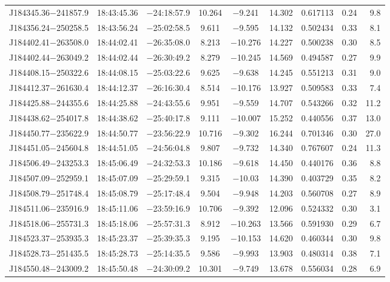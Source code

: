 \begin{table*}
\begin{tabular}{lcccccccr}
J184345.36$-$241857.9 & 18:43:45.36 & $-$24:18:57.9 & 10.264 & $-$9.241 & 14.302 & 0.617113 & 0.24 & 9.8 \\
J184356.24$-$250258.5 & 18:43:56.24 & $-$25:02:58.5 &  9.611 & $-$9.595 & 14.132 & 0.502434 & 0.33 & 8.1 \\
J184402.41$-$263508.0 & 18:44:02.41 & $-$26:35:08.0 &  8.213 & $-$10.276 & 14.227 & 0.500238 & 0.30 & 8.5 \\
J184402.44$-$263049.2 & 18:44:02.44 & $-$26:30:49.2 &  8.279 & $-$10.245 & 14.569 & 0.494587 & 0.27 & 9.9 \\
J184408.15$-$250322.6 & 18:44:08.15 & $-$25:03:22.6 &  9.625 & $-$9.638 & 14.245 & 0.551213 & 0.31 & 9.0 \\
J184412.37$-$261630.4 & 18:44:12.37 & $-$26:16:30.4 &  8.514 & $-$10.176 & 13.927 & 0.509583 & 0.33 & 7.4 \\
J184425.88$-$244355.6 & 18:44:25.88 & $-$24:43:55.6 &  9.951 & $-$9.559 & 14.707 & 0.543266 & 0.32 & 11.2 \\
J184438.62$-$254017.8 & 18:44:38.62 & $-$25:40:17.8 &  9.111 & $-$10.007 & 15.252 & 0.440556 & 0.37 & 13.0 \\
J184450.77$-$235622.9 & 18:44:50.77 & $-$23:56:22.9 & 10.716 & $-$9.302 & 16.244 & 0.701346 & 0.30 & 27.0 \\
J184451.05$-$245604.8 & 18:44:51.05 & $-$24:56:04.8 &  9.807 & $-$9.732 & 14.340 & 0.767607 & 0.24 & 11.3 \\
J184506.49$-$243253.3 & 18:45:06.49 & $-$24:32:53.3 & 10.186 & $-$9.618 & 14.450 & 0.440176 & 0.36 & 8.8 \\
J184507.09$-$252959.1 & 18:45:07.09 & $-$25:29:59.1 &  9.315 & $-$10.03 & 14.390 & 0.403729 & 0.35 & 8.2 \\
J184508.79$-$251748.4 & 18:45:08.79 & $-$25:17:48.4 &  9.504 & $-$9.948 & 14.203 & 0.560708 & 0.27 & 8.9 \\
J184511.06$-$235916.9 & 18:45:11.06 & $-$23:59:16.9 & 10.706 & $-$9.392 & 12.096 & 0.524332 & 0.30 & 3.1 \\
J184518.06$-$255731.3 & 18:45:18.06 & $-$25:57:31.3 &  8.912 & $-$10.263 & 13.566 & 0.591930 & 0.29 & 6.7 \\
J184523.37$-$253935.3 & 18:45:23.37 & $-$25:39:35.3 &  9.195 & $-$10.153 & 14.620 & 0.460344 & 0.30 & 9.8 \\
J184528.73$-$251435.5 & 18:45:28.73 & $-$25:14:35.5 &  9.586 & $-$9.993 & 13.903 & 0.480314 & 0.38 & 7.1 \\
J184550.48$-$243009.2 & 18:45:50.48 & $-$24:30:09.2 & 10.301 & $-$9.749 & 13.678 & 0.556034 & 0.28 & 6.9 \\

\end{tabular}
\end{table*}
